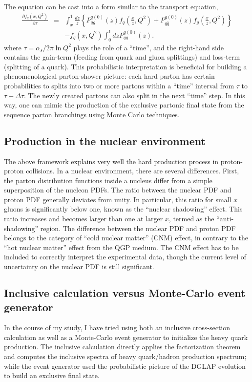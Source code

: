 The equation can be cast into a form similar to the transport equation,
\begin{eqnarray}
\frac{\partial f_q(x, Q^2)}{\partial \tau} &=&  \int_x^1 \frac{dz}{z}\left\{ P_{qg}^{q(0)}(z) f_q\left(\frac{x}{z}, Q^2\right) 
+ P_{q\bar{q}}^{g(0)}(z) f_g\left(\frac{x}{z}, Q^2\right)\right\} \\\nonumber&& - f_q\left(x, Q^2\right) \int_0^1 dz P_{qg}^{q(0)}(z).
\end{eqnarray}
where $\tau = \alpha_s/2\pi \ln Q^2$ plays the role of a ``time'', and the right-hand side contains the gain-term (feeding from quark and gluon splittings) and loss-term (splitting of a quark).
This probabilistic interpretation is beneficial for building a phenomenological parton-shower picture: 
each hard parton has certain probabilities to splits into two or more partons within a ``time'' interval from $\tau$ to $\tau+\Delta \tau$.
The newly created partons can also split in the next ``time'' step.
In this way, one can mimic the production of the exclusive partonic final state from the sequence parton branchings using Monte Carlo techniques.

\subsection{Production in the nuclear environment}
The above framework explains very well the hard production process in proton-proton collisions.
In a nuclear environment, there are several differences.
First, the parton distribution functions inside a nucleus differ from a simple superposition of the nucleon PDFs.
The ratio between the nuclear PDF and proton PDF generally deviates from unity.
In particular, this ratio for small $x$ gluons is significantly below one, known as the ``nuclear shadowing'' effect. 
This ratio increases and becomes larger than one at larger $x$, termed as the ``anti-shadowing'' region.
The difference between the nuclear PDF and proton PDF belongs to the category of ``cold nuclear matter'' (CNM) effect, in contrary to the ``hot nuclear matter'' effect from the QGP medium.
The CNM effect has to be included to correctly interpret the experimental data, though the current level of uncertainty on the nuclear PDF is still significant.

\subsection{Inclusive calculation versus Monte-Carlo event generator}
In the course of my study, I have tried using both an inclusive cross-section calculation as well as a Monte-Carlo event generator to initialize the heavy quark production.
The inclusive calculation directly applies the factorization theorem and computes the inclusive spectra of heavy quark/hadron production spectrum; while the event generator used the probabilistic picture of the DGLAP evolution to build an exclusive final state.

